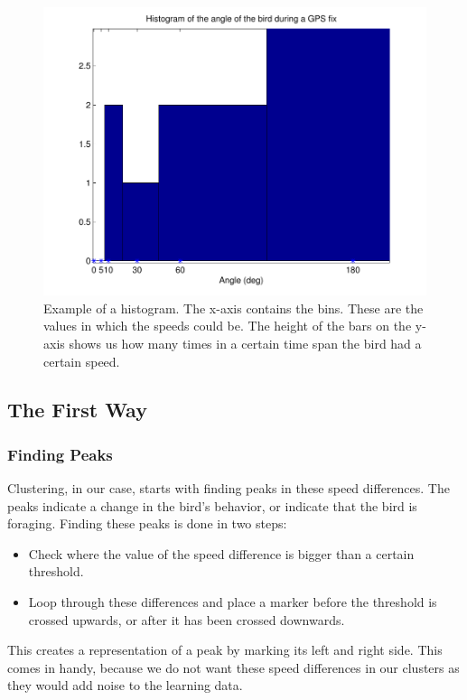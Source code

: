 \begin{figure}
\centering
\includegraphics[width=.8\textwidth]{histogram.pdf}
\caption{Example of a histogram. The x-axis contains the bins. These are the
values in which the speeds could be. The height of the bars on the y-axis shows
us how many times in a certain time span the bird had a certain speed.}
\label{fig:histogram}
\end{figure}

\subsection{The First Way}
 \subsubsection{Finding Peaks}
 Clustering, in our case, starts with finding peaks in these speed differences.
 The peaks indicate a change in the bird's behavior, or indicate that the bird
 is foraging. Finding these peaks is done in two steps:

 \begin{itemize}
    \item Check where the value of the speed difference is bigger than a certain
    threshold.
    \item Loop through these differences and place a marker before the threshold
    is crossed upwards, or after it has been crossed downwards. 
 \end{itemize}
 
 This creates a representation of a peak by marking its left and right side.
 This comes in handy, because we do not want these speed differences in our
 clusters as they would add noise to the learning data.

